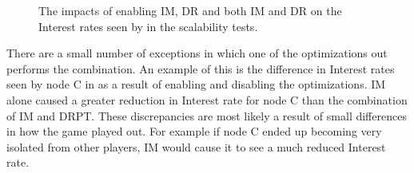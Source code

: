 \begin{figure}[H]
    \centering
    \caption{The impacts of enabling IM, DR and both IM and DR on the Interest rates seen by  in the scalability tests.}
    \label{fig:eval:im-dr:impacts}
\end{figure}


There are a small number of exceptions in which one of the optimizations out performs the combination. An example of this is the difference in Interest rates seen by node C in  as a result of enabling and disabling the optimizations. IM alone caused a greater reduction in Interest rate for node C than the combination of IM and DRPT. These discrepancies are most likely a result of small differences in how the game played out. For example if node C ended up becoming very isolated from other players, IM would cause it to see a much reduced Interest rate. 

